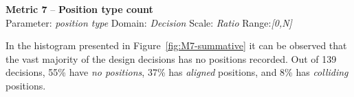 \documentclass[article]{elsarticle}
\begin{document}
\clearpage
\noindent
\textbf{Metric 7} -- \textbf{Position type count}\\
Parameter: \emph{position type} Domain: \emph{Decision} Scale: \emph{Ratio} Range:\emph{[0,N]}

In the histogram presented in Figure~\ref{fig:M7-summative} it can be observed that the vast majority of the design decisions has no positions recorded. Out of 139 decisions, 55\% have \emph{no positions}, 37\% has \emph{aligned} positions, and 8\% has \emph{colliding} positions.
\begin{figure}
  \begin{center}
\begin{comment}
  \begin{tikzpicture}
	\begin{axis}[
		width=\textwidth,
		height=6cm,
	    ylabel=,
	    xtick=data,
		flexible xticklabels from table={M7.csv}{Count bucket}{col sep=tab},
	    enlarge y limits=false,
	    enlarge x limits=0.1,
	    ymin=0,ymax=40,
	    yticklabel={\pgfmathparse{\tick}\pgfmathprintnumber{\pgfmathresult}\%},
	    ybar,
	    ymajorgrids = true,			
	    bar width=7pt, 
	    legend style={ 
	      font=\footnotesize,
	    },
	]  
 
	\addplot+ table[x expr=\coordindex,y={Positive decisions EP}, col sep=tab] {"M7.csv"};
	\addplot+ table[x expr=\coordindex,y={Negative decisions EP}, col sep=tab] {"M7.csv"};
	\addplot+ table[x expr=\coordindex,y={Open decisions EP}, col sep=tab] {"M7.csv"};
	\addplot+ table[x expr=\coordindex,y={Any decisions EP}, col sep=tab] {"M7.csv"};
	\nextgroupplot
	\addplot+ table[x expr=\coordindex,y={Positive decisions SAW}, col sep=tab] {"M7.csv"};
	\addplot+ table[x expr=\coordindex,y={Negative decisions SAW}, col sep=tab] {"M7.csv"};
	\addplot+ table[x expr=\coordindex,y={Open decisions SAW}, col sep=tab] {"M7.csv"};
	\addplot+ table[x expr=\coordindex,y={Any decisions SAW}, col sep=tab] {"M7.csv"};
	\legend{Positive, Negative, Open, Any}     
	\end{axis} 

	\end{tikzpicture}
\end{comment}


\end{center}
\end{figure}
\end{document}
